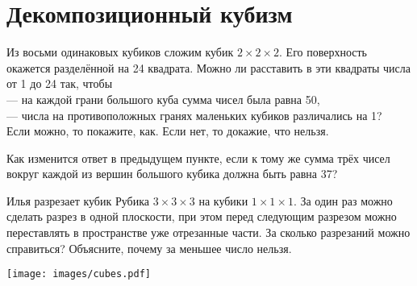 \section{Декомпозиционный кубизм}
\begin{itemize}

\itA Из восьми одинаковых кубиков сложим кубик $2 \times 2 \times 2$. Его поверхность окажется разделённой на 24 квадрата. Можно ли расставить в эти квадраты числа от 1 до 24 так, чтобы \\
— на каждой грани большого куба сумма чисел была равна 50, \\
— числа на противоположных гранях маленьких кубиков различались на 1?\\
Если можно, то покажите, как. Если нет, то докажие, что нельзя.

\itB Как изменится ответ в предыдущем пункте, если к тому же сумма трёх чисел вокруг каждой из вершин большого кубика должна быть равна 37?

\itC Илья разрезает кубик Рубика $3\times 3\times 3$ на кубики $1\times 1\times 1$. За один раз можно сделать разрез в одной плоскости, при этом перед следующим разрезом можно переставлять в пространстве уже отрезанные части. За сколько разрезаний можно справиться? Объясните, почему за меньшее число нельзя.
\end{itemize}

\vspace{-0.3cm}
\begin{center}
\texttt{[image: images/cubes.pdf]}
\end{center} \vspace{-0.7cm}